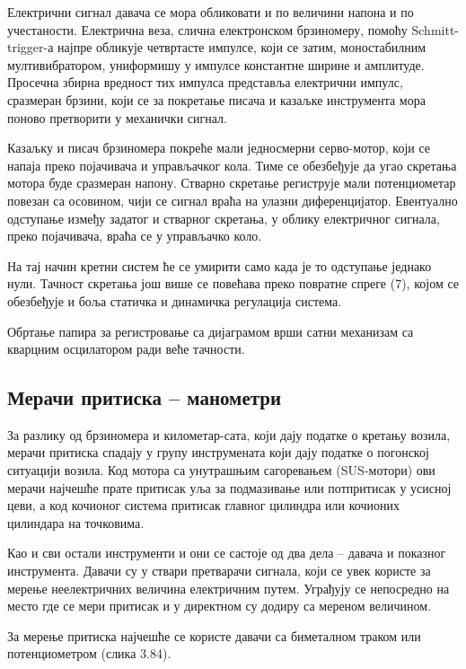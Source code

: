 \documentclass[12pt,a4paper]{report}
\begin{document}
Електрични сигнал давача се мора обликовати и по величини напона и по учестаности. Електрична веза, слична електронском брзиномеру, помоћу Schmitt-trigger-а најпре обликује четвртасте импулсе, који се затим, моностабилним мултивибратором, униформишу у импулсе константне ширине и амплитуде. Просечна збирна вредност тих импулса представља електрични импулс, сразмеран брзини, који се за покретање писача и казаљке инструмента мора поново претворити у механички сигнал.

Казаљку и писач брзиномера покреће мали једносмерни серво-мотор, који се напаја преко појачивача и управљачког кола. Тиме се обезбеђује да угао скретања мотора буде сразмеран напону. Стварно скретање региструје мали потенциометар повезан са осовином, чији се сигнал враћа на улазни диференцијатор. Евентуално одступање између
задатог и стварног скретања, у облику електричног сигнала, преко појачивача, враћа се у управљачко коло.

На тај начин кретни систем ће се умирити само када је то одступање једнако нули. Тачност скретања још више се повећава преко повратне спреге (7), којом се обезбеђује и боља статичка и динамичка регулација система.

Обртање папира за регистровање са дијаграмом врши сатни механизам са кварцним осцилатором ради веће тачности.


\subsection{Мерачи притиска – манометри}

За разлику од брзиномера и километар-сата, који дају податке о кретању возила, мерачи притиска спадају у групу инструмената који дају податке о погонској ситуацији возила. Код мотора са унутрашњим сагоревањем (SUS-мотори) ови мерачи најчешће прате притисак уља за подмазивање или потпритисак у усисној цеви, а код кочионог система притисак главног цилиндра или кочионих цилиндара на точковима.

Као и сви остали инструменти и они се састоје од два дела – давача и показног инструмента. Давачи су у ствари претварачи сигнала, који се увек користе за мерење неелектричних величина електричним путем. Уграђују се непосредно на место где се мери притисак и у директном су додиру са мереном величином.

За мерење притиска најчешће се користе давачи са биметалном траком или потенциометром (слика 3.84).

\end{document}
